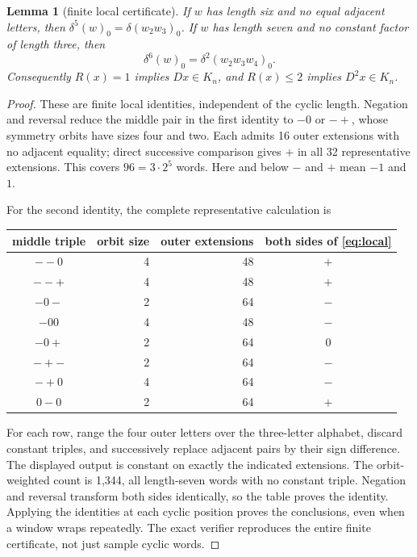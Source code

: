 \documentclass[a4paper,10pt]{amsart}
\newtheorem{lemma}[theorem]{Lemma}
\theoremstyle{remark}
\begin{document}
\begin{lemma}[finite local certificate]\label{lem:local}
If $w$ has length six and no equal adjacent letters, then
$\delta^5(w)_0=\delta(w_2w_3)_0$. If $w$ has length seven and no constant
factor of length three, then
\begin{equation}\label{eq:local}
\delta^6(w)_0=\delta^2(w_2w_3w_4)_0.
\end{equation}
Consequently $R(x)=1$ implies $Dx\in K_n$, and $R(x)\le2$ implies
$D^2x\in K_n$.
\end{lemma}
\begin{proof}
These are finite local identities, independent of the cyclic length.
Negation and reversal reduce the middle pair in the first identity to
$-0$ or $-+$, whose symmetry orbits have sizes four and two. Each admits
16 outer extensions with no adjacent equality; direct successive comparison
gives $+$ in all 32 representative extensions. This covers $96=3\cdot2^5$
words. Here and below $-$ and $+$ mean $-1$ and $1$.

For the second identity, the complete representative calculation is
\begin{center}
\begin{tabular}{c|r r c}
middle triple & orbit size & outer extensions & both sides of \eqref{eq:local}\\\hline
$--0$&4&48&$+$\\
$--+$&4&48&$+$\\
$-0-$&2&64&$-$\\
$-00$&4&48&$-$\\
$-0+$&2&64&$0$\\
$-+-$&2&64&$-$\\
$-+0$&4&64&$-$\\
$0-0$&2&64&$+$
\end{tabular}
\end{center}
For each row, range the four outer letters over the three-letter alphabet,
discard constant triples, and successively replace adjacent pairs by their
sign difference. The displayed output is constant on exactly the indicated
extensions. The orbit-weighted count is 1,344, all length-seven words with
no constant triple. Negation and reversal transform both sides identically,
so the table proves the identity. Applying the identities at each cyclic
position proves the conclusions, even when a window wraps repeatedly.
The exact verifier reproduces the entire finite certificate, not just
sample cyclic words.
\end{proof}
\end{document}
